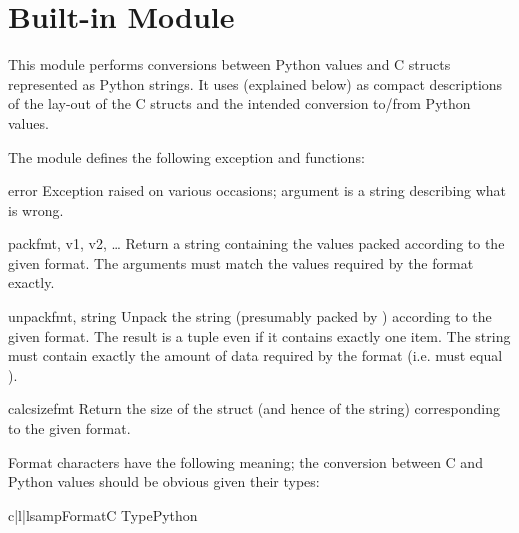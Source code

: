 \section{Built-in Module }



This module performs conversions between Python values and C
structs represented as Python strings.  It uses 
(explained below) as compact descriptions of the lay-out of the C
structs and the intended conversion to/from Python values.

The module defines the following exception and functions:


\begin{excdesc}{error}
  Exception raised on various occasions; argument is a string
  describing what is wrong.
\end{excdesc}

\begin{funcdesc}{pack}{fmt, v1, v2, {\rm \ldots}}
  Return a string containing the values
   packed according to the given
  format.  The arguments must match the values required by the format
  exactly.
\end{funcdesc}

\begin{funcdesc}{unpack}{fmt, string}
  Unpack the string (presumably packed by )
  according to the given format.  The result is a tuple even if it
  contains exactly one item.  The string must contain exactly the
  amount of data required by the format (i.e.   must
  equal ).
\end{funcdesc}

\begin{funcdesc}{calcsize}{fmt}
  Return the size of the struct (and hence of the string)
  corresponding to the given format.
\end{funcdesc}

Format characters have the following meaning; the conversion between C
and Python values should be obvious given their types:

\begin{tableiii}{c|l|l}{samp}{Format}{C Type}{Python}
\end{tableiii}

